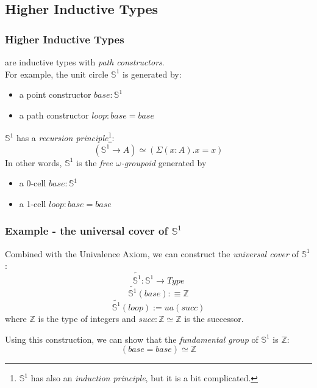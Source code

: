 \documentclass[dvipdfmx]{beamer}
\begin{document}
\subsection{Higher Inductive Types}

\begin{frame}
  \frametitle{Higher Inductive Types}
  are inductive types with {\it path constructors}. \\
  For example, the unit circle ${\mathbb S}^1$ is generated by:
  \begin{itemize}
    \item a point constructor $base : {\mathbb S}^1$
    \item a path constructor $loop : base = base$
  \end{itemize}
  ${\mathbb S}^1$ has a {\it recursion principle}\footnote{
    ${\mathbb S}^1$ has also an {\it induction principle},
    but it is a bit complicated.}:
  $$
  \left( {\mathbb S}^1 \to A \right) \simeq
  \left( \Sigma \left( x : A \right) . x = x \right)
  $$
  In other words, ${\mathbb S}^1$ is the {\it free $\omega$-groupoid}
  generated by
  \begin{itemize}
    \item a 0-cell $base : {\mathbb S}^1$
    \item a 1-cell $loop : base = base$
  \end{itemize}
\end{frame}

\begin{frame}
  \frametitle{Example - the universal cover of ${\mathbb S}^1$}
  Combined with the Univalence Axiom,
  we can construct the {\it universal cover} of ${\mathbb S}^1$:
  $$
    \widetilde{ {\mathbb S}^1 } : {\mathbb S}^1 \to Type
  $$
  $$
    \widetilde{ {\mathbb S}^1 } \left( base \right) :\equiv {\mathbb Z}
  $$
  $$
    \widetilde{ {\mathbb S}^1 } \left( loop \right) := ua \left( succ \right)
  $$
  where ${\mathbb Z}$ is the type of integers
  and $succ : {\mathbb Z} \simeq {\mathbb Z}$ is the successor.

  Using this construction, we can show that
  the {\it fundamental group} of ${\mathbb S}^1$ is ${\mathbb Z}$:
  $$
  \left( base = base \right) \simeq {\mathbb Z}
  $$
\end{frame}
\end{document}
